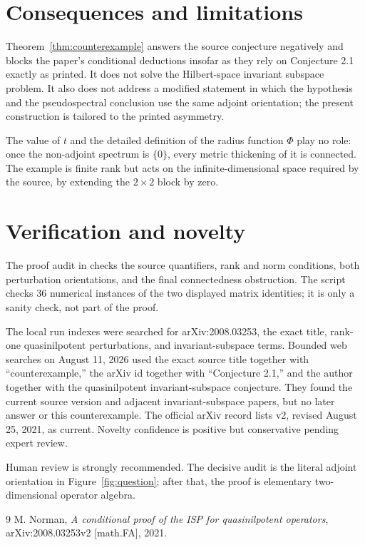 \documentclass[11pt]{article}
\begin{document}
\section{Consequences and limitations}

Theorem~\ref{thm:counterexample} answers the source conjecture negatively and
blocks the paper's conditional deductions insofar as they rely on Conjecture
2.1 exactly as printed. It does not solve the Hilbert-space invariant
subspace problem. It also does not address a modified statement in which the
hypothesis and the pseudospectral conclusion use the same adjoint
orientation; the present construction is tailored to the printed asymmetry.

The value of $t$ and the detailed definition of the radius function $\Phi$
play no role: once the non-adjoint spectrum is $\{0\}$, every metric
thickening of it is connected. The example is finite rank but acts on the
infinite-dimensional space required by the source, by extending the
$2\times2$ block by zero.

\section{Verification and novelty}

The proof audit in  checks the source quantifiers,
rank and norm conditions, both perturbation orientations, and the final
connectedness obstruction. The script  checks
36 numerical instances of the two displayed matrix identities; it is only a
sanity check, not part of the proof.

The local run indexes were searched for arXiv:2008.03253, the exact title,
rank-one quasinilpotent perturbations, and invariant-subspace terms. Bounded
web searches on August 11, 2026 used the exact source title together with
``counterexample,'' the arXiv id together with ``Conjecture 2.1,'' and the
author together with the quasinilpotent invariant-subspace conjecture. They
found the current source version and adjacent invariant-subspace papers, but
no later answer or this counterexample. The official arXiv record lists v2,
revised August 25, 2021, as current. Novelty confidence is positive but
conservative pending expert review.

Human review is strongly recommended. The decisive audit is the literal
adjoint orientation in Figure~\ref{fig:question}; after that, the proof is
elementary two-dimensional operator algebra.

\begin{thebibliography}{9}
M. Norman,
\emph{A conditional proof of the ISP for quasinilpotent operators},
arXiv:2008.03253v2 [math.FA], 2021.
\end{thebibliography}
\end{document}
